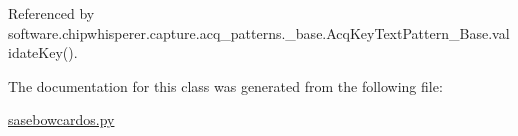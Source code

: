 Referenced by software.\+chipwhisperer.\+capture.\+acq\+\_\+patterns.\+\_\+base.\+Acq\+Key\+Text\+Pattern\+\_\+\+Base.\+validate\+Key().



The documentation for this class was generated from the following file\+:\begin{DoxyCompactItemize}
\item 
\hyperlink{sasebowcardos_8py}{sasebowcardos.\+py}\end{DoxyCompactItemize}

